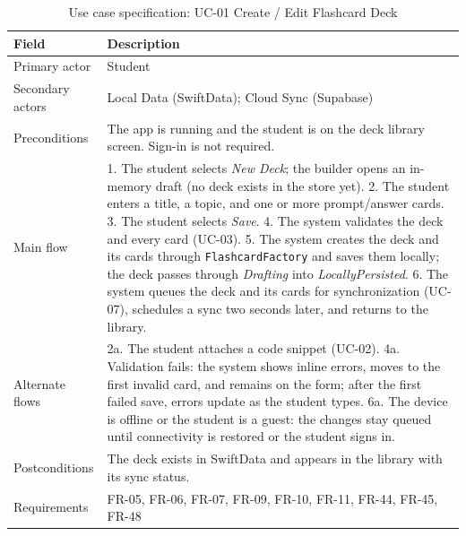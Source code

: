 \documentclass[12pt,letterpaper]{article}
\begin{document}
\begin{table}[H]
\centering
\caption{Use case specification: UC-01 Create / Edit Flashcard Deck}
\label{tab:uc01}
\begin{tabularx}{\textwidth}{@{}L{3.0cm} Y@{}}
\toprule
\textbf{Field} & \textbf{Description} \\
\midrule
Primary actor & Student \\
Secondary actors & Local Data (SwiftData); Cloud Sync (Supabase) \\
Preconditions & The app is running and the student is on the deck library screen. Sign-in is not required. \\
Main flow & 1. The student selects \emph{New Deck}; the builder opens an in-memory draft (no deck exists in the store yet). 2. The student enters a title, a topic, and one or more prompt/answer cards. 3. The student selects \emph{Save}. 4. The system validates the deck and every card (UC-03). 5. The system creates the deck and its cards through \texttt{FlashcardFactory} and saves them locally; the deck passes through \emph{Drafting} into \emph{LocallyPersisted}. 6. The system queues the deck and its cards for synchronization (UC-07), schedules a sync two seconds later, and returns to the library. \\
Alternate flows & 2a. The student attaches a code snippet (UC-02). 4a. Validation fails: the system shows inline errors, moves to the first invalid card, and remains on the form; after the first failed save, errors update as the student types. 6a. The device is offline or the student is a guest: the changes stay queued until connectivity is restored or the student signs in. \\
Postconditions & The deck exists in SwiftData and appears in the library with its sync status. \\
Requirements & FR-05, FR-06, FR-07, FR-09, FR-10, FR-11, FR-44, FR-45, FR-48 \\
\bottomrule
\end{tabularx}
\end{table}
\end{document}
